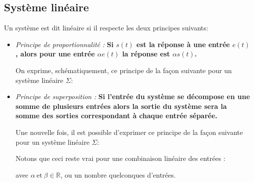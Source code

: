 \subsection{Système linéaire}

Un système est dit linéaire si il respecte les deux principes suivants:

\begin{itemize}
    \item \emph{Principe de proportionnalité :}
          \textbf{Si $s(t)$ est la réponse à une entrée $e(t)$, alors 
          pour une entrée $\alpha e(t)$ la réponse est $\alpha s(t)$.}
        
    On exprime, schématiquement, ce principe de la façon suivante pour 
    un système linéaire $\Sigma$:
    \begin{center}
    
    \end{center}

    \item \emph{Principe de superposition :}
     \textbf{Si l'entrée du système se décompose en une somme 
        de plusieurs entrées alors la sortie du système sera la somme des 
        sorties correspondant à chaque entrée séparée.}

    Une nouvelle fois, il est possible d'exprimer ce principe de la façon 
    suivante pour un système linéaire $\Sigma$:
    \begin{center}
    
    \end{center}

    Notons que ceci reste vrai pour une combinaison linéaire des entrées :
    \begin{center}
    
    \end{center}
    avec $\alpha\ \text{et}\ \beta\in\mathbb{R}$, ou un nombre quelconques 
    d'entrées.
\end{itemize}

